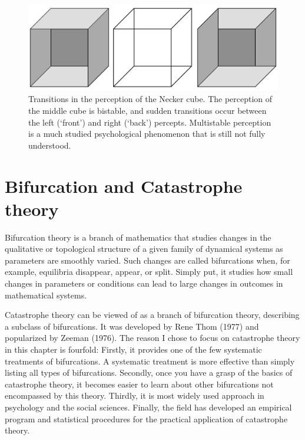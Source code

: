 \documentclass[
  a4paper,
  DIV=11,
  numbers=noendperiod,
  oneside]{scrreprt}
\begin{document}
\begin{figure}

{\centering \includegraphics{media/ch3/ch3-02__figure14.png}

}

\caption{\label{fig-ch3-img2-old-14}Transitions in the perception of the
Necker cube. The perception of the middle cube is bistable, and sudden
transitions occur between the left (`front') and right (`back')
percepts. Multistable perception is a much studied psychological
phenomenon that is still not fully understood.}

\end{figure}

\hypertarget{sec-Bifurcation-and-Catastrophe-theory}{%
\section{Bifurcation and Catastrophe
theory}\label{sec-Bifurcation-and-Catastrophe-theory}}

Bifurcation theory is a branch of mathematics that studies changes in
the qualitative or topological structure of a given family of dynamical
systems as parameters are smoothly varied. Such changes are called
bifurcations when, for example, equilibria disappear, appear, or split.
Simply put, it studies how small changes in parameters or conditions can
lead to large changes in outcomes in mathematical systems.

Catastrophe theory can be viewed of as a branch of bifurcation theory,
describing a subclass of bifurcations. It was developed by Rene Thom
(1977) and popularized by Zeeman (1976). The reason I chose to focus on
catastrophe theory in this chapter is fourfold: Firstly, it provides one
of the few systematic treatments of bifurcations. A systematic treatment
is more effective than simply listing all types of bifurcations.
Secondly, once you have a grasp of the basics of catastrophe theory, it
becomes easier to learn about other bifurcations not encompassed by this
theory. Thirdly, it is most widely used approach in psychology and the
social sciences. Finally, the field has developed an empirical program
and statistical procedures for the practical application of catastrophe
theory.
\end{document}
